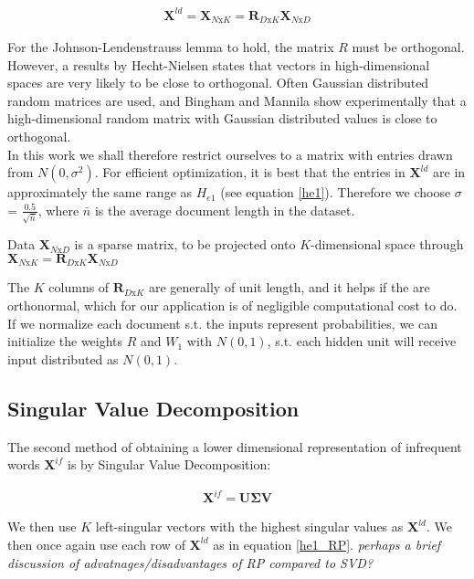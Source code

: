 \documentclass{report}
\begin{document}
\begin{align}
\mathbf{X}^{ld} = \mathbf{X}_{N\text{x}K} = \mathbf{R}_{D\text{x}K}\mathbf{X}_{N\text{x}D}
\end{align}

 For the Johnson-Lendenstrauss lemma to hold, the matrix $R$ must be orthogonal. However, a results by Hecht-Nielsen \cite{hecht1994context} states that vectors in high-dimensional spaces are very likely to be close to orthogonal. Often Gaussian distributed random matrices are used, and Bingham  and Mannila \cite{bingham2001random} show experimentally that a high-dimensional random matrix with Gaussian distributed values is close to orthogonal. \\
In this work we shall therefore restrict ourselves to a matrix with entries drawn from $N(0,\sigma^2)$. For efficient optimization, it is best that the entries in $\mathbf{X}^{ld}$ are in approximately the same range as $H_{e1}$ (see equation \ref{he1}). Therefore we choose $\sigma$ = $\frac{0.5}{\sqrt{\bar{n}}}$, where $\bar{n}$ is the average document length in the dataset. 

Data $\mathbf{X}_{N\text{x}D}$ is a sparse matrix, to be projected onto $K$-dimensional space through $\mathbf{X}_{N\text{x}K} = \mathbf{R}_{D\text{x}K}\mathbf{X}_{N\text{x}D}$

The $K$ columns of $\mathbf{R}_{D\text{x}K}$ are generally of unit length, and it helps if the are orthonormal, which for our application is of negligible computational cost to do. If we normalize each document s.t. the inputs represent probabilities, we can initialize the weights $R$ and $W_1$ with $N(0,1)$, s.t. each hidden unit will receive input distributed as $N(0,1)$. 

\subsection{Singular Value Decomposition}\label{SVD}
The second method of obtaining a lower dimensional representation of infrequent words $\mathbf{X}^{if}$ is by Singular Value Decomposition:

\begin{align}
\mathbf{X}^{if} = \mathbf{U\Sigma V}
\end{align}

We then use $K$ left-singular vectors with the highest singular values as $\mathbf{X}^{ld}$. We then once again use each row of $\mathbf{X}^{ld}$ as in equation \ref{he1_RP}.
\textit{perhaps a brief discussion of advatnages/disadvantages of RP compared to SVD?}
\end{document}
